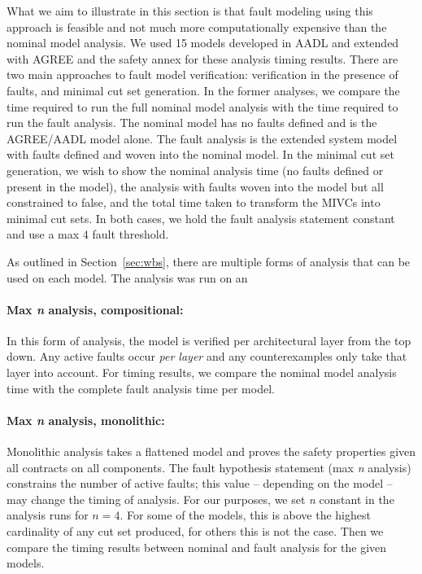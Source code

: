 What we aim to illustrate in this section is that fault modeling using this approach is feasible and not much more computationally expensive than the nominal model analysis. We used 15 models developed in AADL and extended with AGREE and the safety annex for these analysis timing results. There are two main approaches to fault model verification: verification in the presence of faults, and minimal cut set generation. In the former analyses, we compare the time required to run the full nominal model analysis with the time required to run the fault analysis. The nominal model has no faults defined and is the AGREE/AADL model alone. The fault analysis is the extended system model with faults defined and woven into the nominal model. In the minimal cut set generation, we wish to show the nominal analysis time (no faults defined or present in the model), the analysis with faults woven into the model but all constrained to false, and the total time taken to transform the MIVCs into minimal cut sets. In both cases, we hold the fault analysis statement constant and use a max $4$ fault threshold. 




As outlined in Section~\ref{sec:wbs}, there are multiple forms of analysis that can be used on each model. The analysis was run on an 

\paragraph{Max \textit{n} analysis, compositional:} In this form of analysis, the model is verified per architectural layer from the top down. Any active faults occur {\em per layer} and any counterexamples only take that layer into account. For timing results, we compare the nominal model analysis time with the complete fault analysis time per model. 


\paragraph{Max \textit{n} analysis, monolithic:} Monolithic analysis takes a flattened model and proves the safety properties given all contracts on all components. The fault hypothesis statement (max \textit{n} analysis) constrains the number of active faults; this value -- depending on the model -- may change the timing of analysis. For our purposes, we set \textit{n} constant in the analysis runs for $n = 4$. For some of the models, this is above the highest cardinality of any cut set produced, for others this is not the case. Then we compare the timing results between nominal and fault analysis for the given models.

